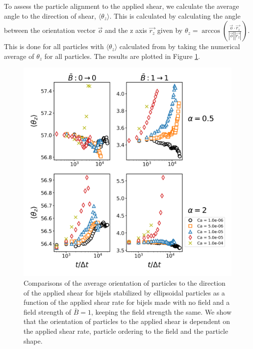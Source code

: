 To assess the particle alignment to the applied shear, we calculate the average angle to the direction of shear, $\langle \theta_z \rangle$. This is calculated
by calculating the angle between the orientation vector $\vec{o}$ and the z axis $\vec{r_z}$ given by 
$\theta_z = \arccos(\frac{ \vec{o} \cdot \vec{r_z} }{ |\vec{o}| |\vec{r_z}| })$. This is done for all particles with $\langle \theta_z \rangle$ calculated from
by taking the numerical average of $\theta_z$ for all particles. The results are plotted in Figure \ref{fig:theta_z_specific}.

\begin{figure} 
    \centering 
    \includegraphics[scale=0.3]{../figures/results/paper3/theta_z-time_compare-specific.png} 
    \caption{Comparisons of the average orientation of particles to the direction of the applied shear for bijels stabilized by
             ellipsoidal particles as a function of the applied shear rate for bijels made with no field and a field strength of $\bar{B} = 1$,
             keeping the field strength the same. We show that the orientation of particles to the applied shear is dependent on the
             applied shear rate, particle ordering to the field and the particle shape.} 
    \label{fig:theta_z_specific} 
\end{figure}

